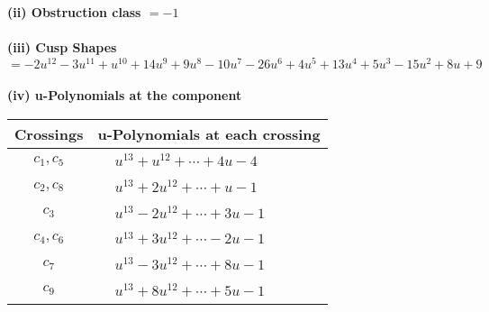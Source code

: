 \documentclass[1p]{elsarticle_modified}
\theoremstyle{definition}
\begin{document}
\flushleft \textbf{(ii) Obstruction class $= -1$}\\~\\
\flushleft \textbf{(iii) Cusp Shapes $= -2 u^{12}-3 u^{11}+u^{10}+14 u^9+9 u^8-10 u^7-26 u^6+4 u^5+13 u^4+5 u^3-15 u^2+8 u+9$}\\~\\
\newpage\renewcommand{\arraystretch}{1}
\flushleft \textbf{(iv) u-Polynomials at the component}\newline \\
\begin{tabular}{m{50pt}|m{274pt}}
Crossings & \hspace{64pt}u-Polynomials at each crossing \\
\hline $$\begin{aligned}c_{1},c_{5}\end{aligned}$$&$\begin{aligned}
&u^{13}+u^{12}+\cdots+4 u-4
\end{aligned}$\\
\hline $$\begin{aligned}c_{2},c_{8}\end{aligned}$$&$\begin{aligned}
&u^{13}+2 u^{12}+\cdots+u-1
\end{aligned}$\\
\hline $$\begin{aligned}c_{3}\end{aligned}$$&$\begin{aligned}
&u^{13}-2 u^{12}+\cdots+3 u-1
\end{aligned}$\\
\hline $$\begin{aligned}c_{4},c_{6}\end{aligned}$$&$\begin{aligned}
&u^{13}+3 u^{12}+\cdots-2 u-1
\end{aligned}$\\
\hline $$\begin{aligned}c_{7}\end{aligned}$$&$\begin{aligned}
&u^{13}-3 u^{12}+\cdots+8 u-1
\end{aligned}$\\
\hline $$\begin{aligned}c_{9}\end{aligned}$$&$\begin{aligned}
&u^{13}+8 u^{12}+\cdots+5 u-1
\end{aligned}$\\
\hline
\end{tabular}\\~\\
\end{document}
